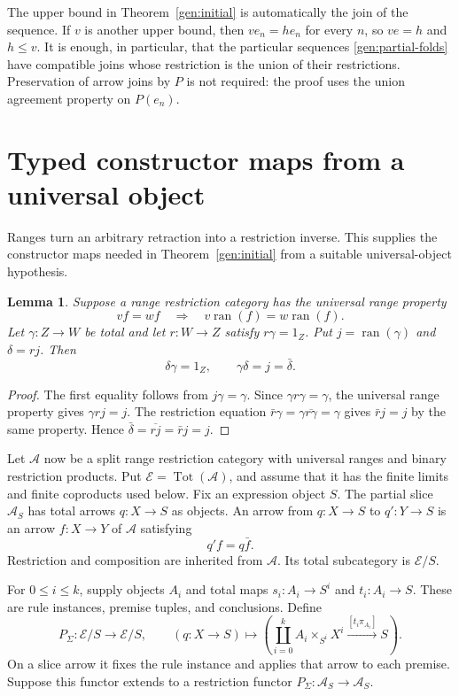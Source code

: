 \documentclass[11pt]{article}
\newtheorem{lemma}[theorem]{Lemma}
\theoremstyle{definition}
\theoremstyle{remark}
\newcommand{\ran}{\operatorname{ran}}
\newcommand{\Tot}{\operatorname{Tot}}
\begin{document}
The upper bound in Theorem~\ref{gen:initial} is automatically the join
of the sequence. If $v$ is another upper bound, then
$ve_n=he_n$ for every $n$, so $ve=h$ and $h\le v$.
It is enough, in particular, that the particular sequences
\eqref{gen:partial-folds} have compatible joins whose restriction is the
union of their restrictions. Preservation of arrow joins by $P$ is not
required: the proof uses the union agreement property on $P(e_n)$.

\section{Typed constructor maps from a universal object}\label{gen:coding}

Ranges turn an arbitrary retraction into a restriction inverse. This
supplies the constructor maps needed in Theorem~\ref{gen:initial}
from a suitable universal-object hypothesis.

\begin{lemma}\label{gen:section-inverse}
Suppose a range restriction category has the universal range property
\[
 vf=wf\quad\Longrightarrow\quad
 v\ran(f)=w\ran(f).
\]
Let $\gamma:Z\to W$ be total and let $r:W\to Z$ satisfy
$r\gamma=1_Z$. Put $j=\ran(\gamma)$ and $\delta=rj$. Then
\[
 \delta\gamma=1_Z,\qquad
 \gamma\delta=j=\bar\delta.
\]
\end{lemma}
\begin{proof}
The first equality follows from $j\gamma=\gamma$. Since
$\gamma r\gamma=\gamma$, the universal range property gives
$\gamma rj=j$. The restriction equation
$\bar r\gamma=\gamma\overline{r\gamma}=\gamma$ gives
$\bar rj=j$ by the same property. Hence
$\bar\delta=\overline{rj}=\bar rj=j$.
\end{proof}

Let $\mathscr A$ now be a split range restriction category with
universal ranges and binary restriction products. Put
$\mathscr E=\Tot(\mathscr A)$, and assume that it has the finite
limits and finite coproducts used below. Fix an expression object $S$.
The partial slice $\mathscr A_S$ has total arrows $q:X\to S$ as
objects. An arrow from $q:X\to S$ to $q':Y\to S$ is an arrow
$f:X\to Y$ of $\mathscr A$ satisfying
\[
 q'f=q\bar f.
\]
Restriction and composition are inherited from $\mathscr A$.
Its total subcategory is $\mathscr E/S$.

For $0\le i\le k$, supply objects $A_i$ and total maps
$s_i:A_i\to S^i$ and $t_i:A_i\to S$. These are rule instances,
premise tuples, and conclusions. Define
\[
 P_\Sigma:\mathscr E/S\longrightarrow\mathscr E/S,
 \qquad
 (q:X\to S)\longmapsto
 \left(\coprod_{i=0}^k A_i\times_{S^i}X^i
     \xrightarrow{[t_i\pi_{A_i}]}S\right).
\]
On a slice arrow it fixes the rule instance and applies that arrow to
each premise. Suppose this functor extends to a restriction functor
$P_\Sigma:\mathscr A_S\to\mathscr A_S$.
\end{document}
